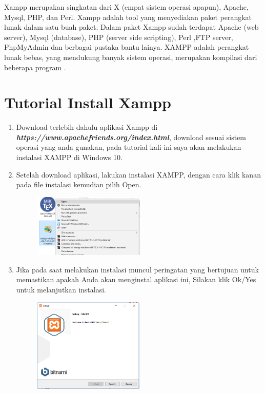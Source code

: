 Xampp merupakan singkatan dari X (empat sistem operasi apapun), Apache, Mysql, PHP, dan Perl. Xampp adalah tool yang menyediakan paket perangkat lunak dalam satu buah paket. Dalam paket Xampp sudah terdapat Apache (web server), Mysql (database), PHP (server side scripting), Perl ,FTP server, PhpMyAdmin dan berbagai pustaka bantu lainya. XAMPP adalah perangkat lunak bebas, yang mendukung banyak sistem operasi, merupakan kompilasi dari beberapa program \cite{sugiarto2019aplikasi}.

\section{Tutorial Install Xampp}
\begin{enumerate}
	\item Download terlebih dahulu aplikasi Xampp di \textbf{\textit{https://www.apachefriends.org/index.html}}, download sesuai sistem operasi yang anda gunakan, pada tutorial kali ini saya akan melakukan instalasi XAMPP di Windows 10.
    
	\item Setelah download aplikasi, lakukan instalasi XAMPP, dengan cara klik kanan pada file instalasi kemudian pilih Open.
		\begin{figure}[!htbp]
    		\centering
    		\includegraphics[width=0.5\textwidth]{figures/Xampp2.png}
    		\label{Xampp2}
		\end{figure}
		
	\item Jika pada saat melakukan instalasi muncul peringatan yang bertujuan untuk memastikan apakah Anda akan menginstal aplikasi ini, Silakan klik Ok/Yes untuk melanjutkan instalasi.
		\begin{figure}[!htbp]
    		\centering
    		\includegraphics[width=0.5\textwidth]{figures/Xampp3.PNG}
    		\label{Xampp3}
		\end{figure}
		

\end{enumerate}
